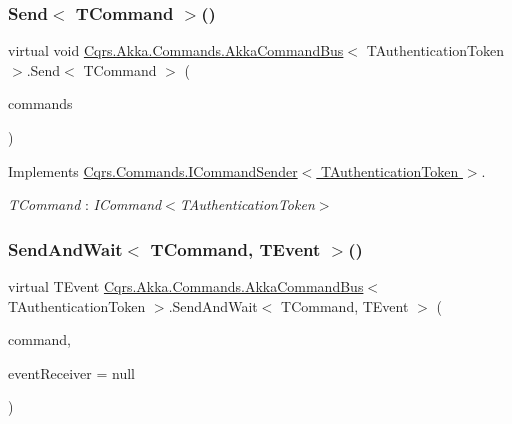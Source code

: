 \subsubsection{\texorpdfstring{Send$<$ T\+Command $>$()}{Send< TCommand >()}\hspace{0.1cm}{\footnotesize\ttfamily [2/2]}}
{\footnotesize\ttfamily virtual void \hyperlink{classCqrs_1_1Akka_1_1Commands_1_1AkkaCommandBus}{Cqrs.\+Akka.\+Commands.\+Akka\+Command\+Bus}$<$ T\+Authentication\+Token $>$.Send$<$ T\+Command $>$ (\begin{DoxyParamCaption}\item[{I\+Enumerable$<$ T\+Command $>$}]{commands }\end{DoxyParamCaption})\hspace{0.3cm}{\ttfamily [virtual]}}



Implements \hyperlink{interfaceCqrs_1_1Commands_1_1ICommandSender_a3fb3ec40a3e862f721a7c9204e67e832}{Cqrs.\+Commands.\+I\+Command\+Sender$<$ T\+Authentication\+Token $>$}.

\begin{Desc}
\item[Type Constraints]\begin{description}
\item[{\em T\+Command} : {\em I\+Command$<$T\+Authentication\+Token$>$}]\end{description}
\end{Desc}
\mbox{\label{classCqrs_1_1Akka_1_1Commands_1_1AkkaCommandBus_a10ed94fc318977777e2e6cc970b8953e}} 
\subsubsection{\texorpdfstring{Send\+And\+Wait$<$ T\+Command, T\+Event $>$()}{SendAndWait< TCommand, TEvent >()}\hspace{0.1cm}{\footnotesize\ttfamily [1/6]}}
{\footnotesize\ttfamily virtual T\+Event \hyperlink{classCqrs_1_1Akka_1_1Commands_1_1AkkaCommandBus}{Cqrs.\+Akka.\+Commands.\+Akka\+Command\+Bus}$<$ T\+Authentication\+Token $>$.Send\+And\+Wait$<$ T\+Command, T\+Event $>$ (\begin{DoxyParamCaption}\item[{T\+Command}]{command,  }\item[{\hyperlink{interfaceCqrs_1_1Events_1_1IEventReceiver}{I\+Event\+Receiver}$<$ T\+Authentication\+Token $>$}]{event\+Receiver = {\ttfamily null} }\end{DoxyParamCaption})\hspace{0.3cm}{\ttfamily [virtual]}}



